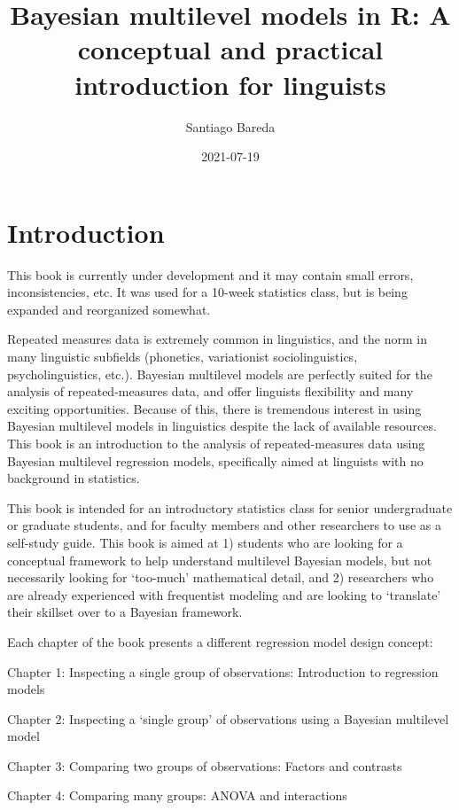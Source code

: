 \documentclass[
]{book}
\title{Bayesian multilevel models in R: A conceptual and practical introduction for linguists}
\author{Santiago Bareda}
\date{2021-07-19}
\begin{document}
\maketitle

{
\setcounter{tocdepth}{1}
\tableofcontents
}
\hypertarget{introduction}{%
\chapter*{Introduction}\label{introduction}}

This book is currently under development and it may contain small errors, inconsistencies, etc. It was used for a 10-week statistics class, but is being expanded and reorganized somewhat.

Repeated measures data is extremely common in linguistics, and the norm in many linguistic subfields (phonetics, variationist sociolinguistics, psycholinguistics, etc.). Bayesian multilevel models are perfectly suited for the analysis of repeated-measures data, and offer linguists flexibility and many exciting opportunities. Because of this, there is tremendous interest in using Bayesian multilevel models in linguistics despite the lack of available resources. This book is an introduction to the analysis of repeated-measures data using Bayesian multilevel regression models, specifically aimed at linguists with no background in statistics.

This book is intended for an introductory statistics class for senior undergraduate or graduate students, and for faculty members and other researchers to use as a self-study guide. This book is aimed at 1) students who are looking for a conceptual framework to help understand multilevel Bayesian models, but not necessarily looking for `too-much' mathematical detail, and 2) researchers who are already experienced with frequentist modeling and are looking to `translate' their skillset over to a Bayesian framework.

Each chapter of the book presents a different regression model design concept:

Chapter 1: Inspecting a single group of observations: Introduction to regression models

Chapter 2: Inspecting a `single group' of observations using a Bayesian multilevel model

Chapter 3: Comparing two groups of observations: Factors and contrasts

Chapter 4: Comparing many groups: ANOVA and interactions
\end{document}
